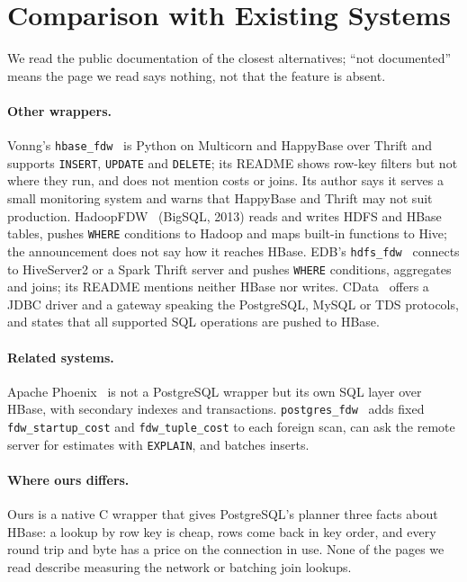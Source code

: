 \documentclass[11pt,a4paper]{article}
\newcommand{\code}[1]{\texttt{#1}}
\begin{document}
\section{Comparison with Existing Systems}
\label{sec:compare}
We read the public documentation of the closest alternatives; ``not documented'' means the page we read says nothing, not that the feature is absent.

\paragraph{Other wrappers.} Vonng's \code{hbase\_fdw}~\cite{vonng} is Python on Multicorn and HappyBase over Thrift and supports \code{INSERT}, \code{UPDATE} and \code{DELETE}; its README shows row-key filters but not where they run, and does not mention costs or joins. Its author says it serves a small monitoring system and warns that HappyBase and Thrift may not suit production. HadoopFDW~\cite{hadoopfdw} (BigSQL, 2013) reads and writes HDFS and HBase tables, pushes \code{WHERE} conditions to Hadoop and maps built-in functions to Hive; the announcement does not say how it reaches HBase. EDB's \code{hdfs\_fdw}~\cite{hdfsfdw} connects to HiveServer2 or a Spark Thrift server and pushes \code{WHERE} conditions, aggregates and joins; its README mentions neither HBase nor writes. CData~\cite{cdata} offers a JDBC driver and a gateway speaking the PostgreSQL, MySQL or TDS protocols, and states that all supported SQL operations are pushed to HBase.

\paragraph{Related systems.} Apache Phoenix~\cite{phoenix} is not a PostgreSQL wrapper but its own SQL layer over HBase, with secondary indexes and transactions. \code{postgres\_fdw}~\cite{pgfdw} adds fixed \code{fdw\_startup\_cost} and \code{fdw\_tuple\_cost} to each foreign scan, can ask the remote server for estimates with \code{EXPLAIN}, and batches inserts.

\paragraph{Where ours differs.} Ours is a native C wrapper that gives PostgreSQL's planner three facts about HBase: a lookup by row key is cheap, rows come back in key order, and every round trip and byte has a price on the connection in use. None of the pages we read describe measuring the network or batching join lookups.
\end{document}

